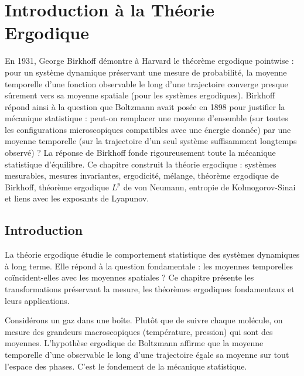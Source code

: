 \chapter{Introduction \`a la Th\'eorie Ergodique}
\label{ch:ergodique}

En 1931, George Birkhoff démontre à Harvard le théorème ergodique pointwise : pour un système dynamique préservant une mesure de probabilité, la moyenne temporelle d'une fonction observable le long d'une trajectoire converge presque sûrement vers sa moyenne spatiale (pour les systèmes ergodiques). Birkhoff répond ainsi à la question que Boltzmann avait posée en 1898 pour justifier la mécanique statistique : peut-on remplacer une moyenne d'ensemble (sur toutes les configurations microscopiques compatibles avec une énergie donnée) par une moyenne temporelle (sur la trajectoire d'un seul système suffisamment longtemps observé) ? La réponse de Birkhoff fonde rigoureusement toute la mécanique statistique d'équilibre. Ce chapitre construit la théorie ergodique : systèmes mesurables, mesures invariantes, ergodicité, mélange, théorème ergodique de Birkhoff, théorème ergodique $L^p$ de von Neumann, entropie de Kolmogorov-Sinai et liens avec les exposants de Lyapunov.

\section{Introduction}

La th\'eorie ergodique \'etudie le comportement
statistique des syst\`emes dynamiques \`a long terme. Elle r\'epond \`a la
question fondamentale : les moyennes temporelles co\"incident-elles avec les
moyennes spatiales ? Ce chapitre pr\'esente les transformations pr\'eservant
la mesure, les th\'eor\`emes ergodiques fondamentaux et leurs applications.

\begin{intuition}
Consid\'erons un gaz dans une bo\^ite. Plut\^ot que de suivre chaque
mol\'ecule, on mesure des grandeurs macroscopiques (temp\'erature, pression)
qui sont des moyennes. L'hypoth\`ese ergodique de Boltzmann affirme que la
moyenne temporelle d'une observable le long d'une trajectoire \'egale sa
moyenne sur tout l'espace des phases. C'est le fondement de la m\'ecanique
statistique.
\end{intuition}

